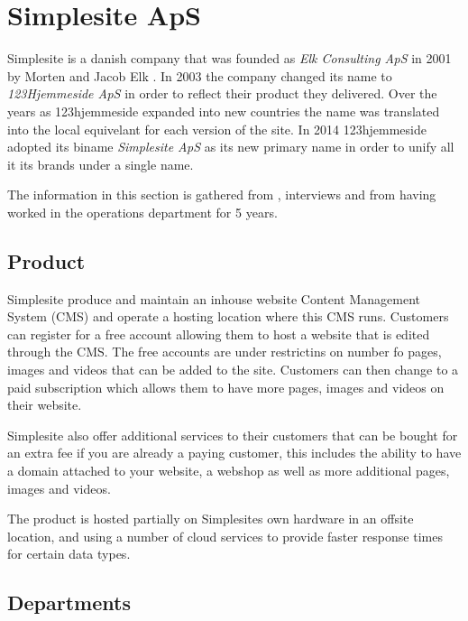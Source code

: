 \section{Simplesite ApS}

Simplesite is a danish company that was founded as \textit{Elk Consulting ApS}
in 2001 by Morten and Jacob Elk \cite{cvr2016simplesite}. In 2003 the company
changed its name to \textit{123Hjemmeside ApS} in order to reflect their product
they delivered. Over the years as 123hjemmeside expanded into new countries the
name was translated into the local equivelant for each version of the site. In
2014 123hjemmeside adopted its biname \textit{Simplesite ApS} as its new primary
name in order to unify all it its brands under a single name.

The information in this section is gathered from \cite{cvr2016simplesite},
interviews and from having worked in the operations department for 5 years.

\subsection{Product}

Simplesite produce and maintain an inhouse website Content Management System
(CMS) and operate a hosting location where this CMS runs. Customers can register
for a free account allowing them to host a website that is edited through the
CMS. The free accounts are under restrictins on number fo pages, images and
videos that can be added to the site. Customers can then change to a paid
subscription which allows them to have more pages, images and videos on their
website.

Simplesite also offer additional services to their customers that can be bought
for an extra fee if you are already a paying customer, this includes the ability
to have a domain attached to your website, a webshop as well as more additional
pages, images and videos.

The product is hosted partially on Simplesites own hardware in an offsite
location, and using a number of cloud services to provide faster response times
for certain data types.


\subsection{Departments}

